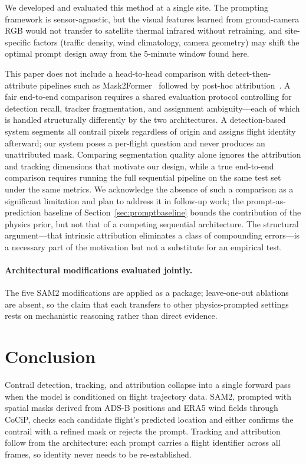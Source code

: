 \documentclass[1p,11pt]{elsarticle}
\begin{document}
We developed and evaluated this method at a single site. The prompting framework is sensor-agnostic, but the visual features learned from ground-camera RGB would not transfer to satellite thermal infrared without retraining, and site-specific factors (traffic density, wind climatology, camera geometry) may shift the optimal prompt design away from the 5-minute window found here.

This paper does not include a head-to-head comparison with detect-then-attribute pipelines such as Mask2Former~\cite{cheng2021maskformer, cheng2021mask2former_video} followed by post-hoc attribution~\cite{dalmau2025attribution}. A fair end-to-end comparison requires a shared evaluation protocol controlling for detection recall, tracker fragmentation, and assignment ambiguity---each of which is handled structurally differently by the two architectures. A detection-based system segments all contrail pixels regardless of origin and assigns flight identity afterward; our system poses a per-flight question and never produces an unattributed mask. Comparing segmentation quality alone ignores the attribution and tracking dimensions that motivate our design, while a true end-to-end comparison requires running the full sequential pipeline on the same test set under the same metrics. We acknowledge the absence of such a comparison as a significant limitation and plan to address it in follow-up work; the prompt-as-prediction baseline of Section~\ref{sec:promptbaseline} bounds the contribution of the physics prior, but not that of a competing sequential architecture. The structural argument---that intrinsic attribution eliminates a class of compounding errors---is a necessary part of the motivation but not a substitute for an empirical test.

\paragraph{Architectural modifications evaluated jointly.} The five SAM2 modifications are applied as a package; leave-one-out ablations are absent, so the claim that each transfers to other physics-prompted settings rests on mechanistic reasoning rather than direct evidence.


\section{Conclusion}

Contrail detection, tracking, and attribution collapse into a single forward pass when the model is conditioned on flight trajectory data. SAM2, prompted with spatial masks derived from ADS-B positions and ERA5 wind fields through CoCiP, checks each candidate flight's predicted location and either confirms the contrail with a refined mask or rejects the prompt. Tracking and attribution follow from the architecture: each prompt carries a flight identifier across all frames, so identity never needs to be re-established.
\end{document}
